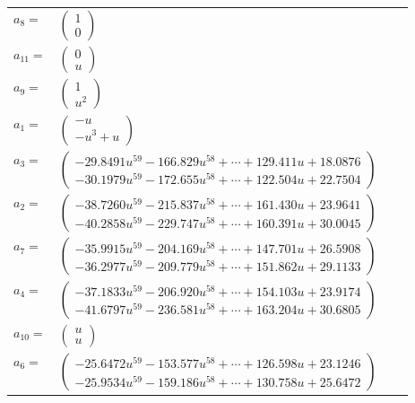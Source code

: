 \documentclass[1p]{elsarticle_modified}
\theoremstyle{definition}
\begin{document}
\begin{tabular}{m{7pt} m{180pt} m{7pt} m{180pt} }
\flushright $a_{8}=$&$\begin{pmatrix}1\\0\end{pmatrix}$ \\
\flushright $a_{11}=$&$\begin{pmatrix}0\\u\end{pmatrix}$ \\
\flushright $a_{9}=$&$\begin{pmatrix}1\\u^2\end{pmatrix}$ \\
\flushright $a_{1}=$&$\begin{pmatrix}- u\\- u^3+u\end{pmatrix}$ \\
\flushright $a_{3}=$&$\begin{pmatrix}-29.8491 u^{59}-166.829 u^{58}+\cdots+129.411 u+18.0876\\-30.1979 u^{59}-172.655 u^{58}+\cdots+122.504 u+22.7504\end{pmatrix}$ \\
\flushright $a_{2}=$&$\begin{pmatrix}-38.7260 u^{59}-215.837 u^{58}+\cdots+161.430 u+23.9641\\-40.2858 u^{59}-229.747 u^{58}+\cdots+160.391 u+30.0045\end{pmatrix}$ \\
\flushright $a_{7}=$&$\begin{pmatrix}-35.9915 u^{59}-204.169 u^{58}+\cdots+147.701 u+26.5908\\-36.2977 u^{59}-209.779 u^{58}+\cdots+151.862 u+29.1133\end{pmatrix}$ \\
\flushright $a_{4}=$&$\begin{pmatrix}-37.1833 u^{59}-206.920 u^{58}+\cdots+154.103 u+23.9174\\-41.6797 u^{59}-236.581 u^{58}+\cdots+163.204 u+30.6805\end{pmatrix}$ \\
\flushright $a_{10}=$&$\begin{pmatrix}u\\u\end{pmatrix}$ \\
\flushright $a_{6}=$&$\begin{pmatrix}-25.6472 u^{59}-153.577 u^{58}+\cdots+126.598 u+23.1246\\-25.9534 u^{59}-159.186 u^{58}+\cdots+130.758 u+25.6472\end{pmatrix}$ \\

\end{tabular}
\end{document}
